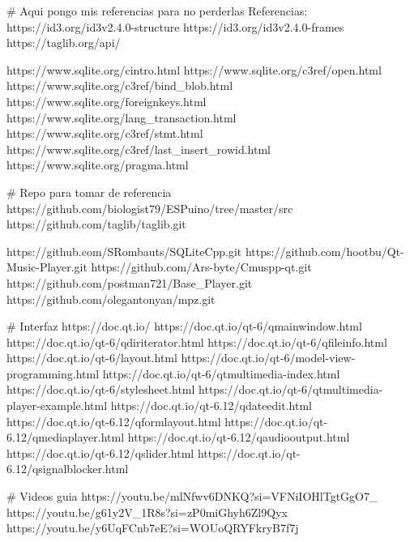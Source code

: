 # Aqui pongo mis referencias para no perderlas
Referencias:
https://id3.org/id3v2.4.0-structure
https://id3.org/id3v2.4.0-frames
https://taglib.org/api/

https://www.sqlite.org/cintro.html
https://www.sqlite.org/c3ref/open.html
https://www.sqlite.org/c3ref/bind_blob.html
https://www.sqlite.org/foreignkeys.html
https://www.sqlite.org/lang_transaction.html
https://www.sqlite.org/c3ref/stmt.html
https://www.sqlite.org/c3ref/last_insert_rowid.html
https://www.sqlite.org/pragma.html

# Repo para tomar de referencia
https://github.com/biologist79/ESPuino/tree/master/src
https://github.com/taglib/taglib.git

https://github.com/SRombauts/SQLiteCpp.git
https://github.com/hootbu/Qt-Music-Player.git
https://github.com/Ars-byte/Cmuspp-qt.git
https://github.com/postman721/Base_Player.git
https://github.com/olegantonyan/mpz.git

# Interfaz
https://doc.qt.io/
https://doc.qt.io/qt-6/qmainwindow.html
https://doc.qt.io/qt-6/qdiriterator.html
https://doc.qt.io/qt-6/qfileinfo.html
https://doc.qt.io/qt-6/layout.html
https://doc.qt.io/qt-6/model-view-programming.html
https://doc.qt.io/qt-6/qtmultimedia-index.html
https://doc.qt.io/qt-6/stylesheet.html
https://doc.qt.io/qt-6/qtmultimedia-player-example.html
https://doc.qt.io/qt-6.12/qdateedit.html
https://doc.qt.io/qt-6.12/qformlayout.html
https://doc.qt.io/qt-6.12/qmediaplayer.html
https://doc.qt.io/qt-6.12/qaudiooutput.html
https://doc.qt.io/qt-6.12/qslider.html
https://doc.qt.io/qt-6.12/qsignalblocker.html

# Videos guia
https://youtu.be/mlNfwv6DNKQ?si=VFNiIOHlTgtGgO7_
https://youtu.be/g61y2V_1R8s?si=zP0miGhyh6Zl9Qyx
https://youtu.be/y6UqFCnb7eE?si=WOUoQRYFkryB7f7j
